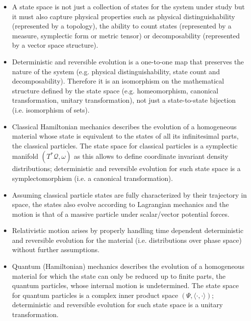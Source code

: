 \documentclass[aps,pra,10pt,twocolumn,floatfix,nofootinbib]{revtex4-1}
\numberwithin{equation}{section}
\theoremstyle{definition}
\begin{document}
\begin{itemize}

\item A state space is not just a collection of states for the system under study but it must also capture physical properties such as physical distinguishability (represented by a topology), the ability to count states (represented by a measure, symplectic form or metric tensor) or decomposability (represented by a vector space structure).

\item Deterministic and reversible evolution is a one-to-one map that preserves the nature of the system (e.g. physical distinguishability, state count and decomposability). Therefore it is an isomorphism on the mathematical structure defined by the state space (e.g. homeomorphism, canonical transformation, unitary transformation), not just a state-to-state bijection (i.e. isomorphism of sets).

\item Classical Hamiltonian mechanics describes the evolution of a homogeneous material whose state is equivalent to the states of all its infinitesimal parts, the classical particles. The state space for classical particles is a symplectic manifold $(T^*\mathcal{Q}, \omega)$ as this allows to define coordinate invariant density distributions; deterministic and reversible evolution for such state space is a symplectomorphism (i.e. a canonical transformation).

\item Assuming classical particle states are fully characterized by their trajectory in space, the states also evolve according to Lagrangian mechanics and the motion is that of a massive particle under scalar/vector potential forces.

\item Relativistic motion arises by properly handling time dependent deterministic and reversible evolution for the material (i.e. distributions over phase space) without further assumptions.

\item Quantum (Hamiltonian) mechanics describes the evolution of a homogeneous material for which the state can only be reduced up to finite parts, the quantum particles, whose internal motion is undetermined. The state space for quantum particles is a complex inner product space $(\Psi, \langle \cdot , \cdot \rangle)$; deterministic and reversible evolution for such state space is a unitary transformation.
\end{itemize}
\end{document}
